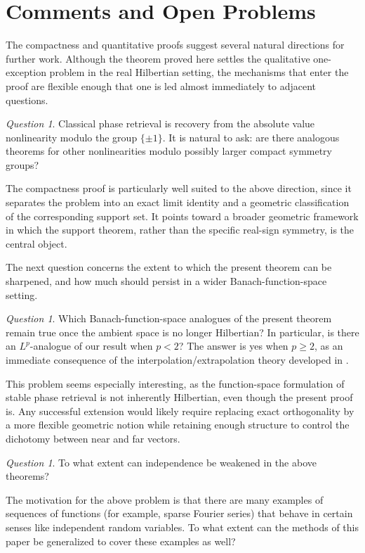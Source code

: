\documentclass[11pt]{amsart}
\numberwithin{equation}{section}
\theoremstyle{definition}
\theoremstyle{remark}
\newtheorem{question}[theorem]{Question}
\begin{document}
\section{Comments and Open Problems}\label{sec:comments}

The compactness and quantitative proofs suggest several natural directions for
further work.  Although the theorem proved here settles the qualitative
one-exception problem in the real Hilbertian setting, the mechanisms that enter
the proof are flexible enough that one is led almost immediately to adjacent
questions. 


\begin{question}
Classical phase retrieval is recovery from the absolute value nonlinearity modulo the group $\{\pm1\}$.  It is
natural to ask: are there analogous theorems for other nonlinearities modulo possibly larger compact symmetry groups?  %
\end{question}

The compactness
proof is particularly well suited to the above direction, since it separates the
problem into an exact limit identity and a geometric classification of the
corresponding support set.  It points toward a broader geometric framework in which the
support theorem, rather than the specific real-sign symmetry, is the central
object.

The next question concerns the extent to which the present theorem can be
sharpened, and how much should persist in a wider Banach-function-space
setting.

\begin{question}
Which Banach-function-space analogues of the present theorem remain true once
the ambient space is no longer Hilbertian? In particular, is there an $L^p$-analogue of our result when $p<2$? The answer is yes when $p\geq 2$,
as an immediate consequence of the interpolation/extrapolation theory developed in \cite{FOTP}.%
\end{question}

This problem seems especially interesting, as the function-space formulation
of stable phase retrieval is not inherently Hilbertian, even though the present
proof is.  Any successful extension would likely require replacing
exact orthogonality by a more flexible geometric notion while retaining enough
structure to control the dichotomy between near and far vectors.
\begin{question}
To what extent can independence be weakened in the above theorems?
\end{question}
The motivation for the above problem is that there are many examples of sequences of functions (for example, sparse Fourier series) that behave in certain senses like independent random variables. To what extent can the methods of this paper be generalized to cover these examples as well?




\end{document}
